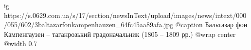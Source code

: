  
 
 
 
 

\ifcmt
  ig https://s.0629.com.ua/s/17/section/newsInText/upload/images/news/intext/000/055/602/3baltazarfonkampenhauzen_64fc45aa89afa.jpg
	@caption Бальтазар фон Кампенгаузен – таганрозький градоначальник (1805 – 1809 рр.)
  @wrap center
  @width 0.7
\fi
